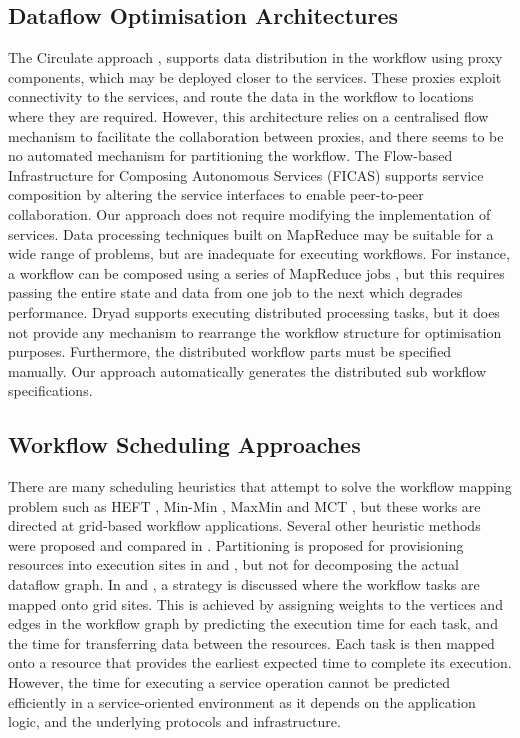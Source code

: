 \documentclass[10pt, conference, compsocconf]{IEEEtran}
\begin{document}
\subsection{Dataflow Optimisation Architectures}
The Circulate approach \cite{Circulate}, \cite{Circulate2} supports data distribution in the workflow using proxy components, which may be deployed closer to the services.
These proxies exploit connectivity to the services, and route the data in the workflow to locations where they are required.
However, this architecture relies on a centralised flow mechanism to facilitate the collaboration between proxies, and there seems to be no automated mechanism for partitioning the workflow.
The Flow-based Infrastructure for Composing Autonomous Services (FICAS) \cite{Ficas} supports service composition by altering the service interfaces to enable peer-to-peer collaboration.
Our approach does not require modifying the implementation of services.
Data processing techniques built on MapReduce \cite{MapReduce} may be suitable for a wide range of problems, but are inadequate for executing workflows.
For instance, a workflow can be composed using a series of MapReduce jobs \cite{MapReduce2}, but this requires passing the entire state and data from one job to the next which degrades performance.
Dryad \cite{Dryad} supports executing distributed processing tasks, but it does not provide any mechanism to rearrange the workflow structure for optimisation purposes.
Furthermore, the distributed workflow parts must be specified manually.
Our approach automatically generates the distributed sub workflow specifications.

\subsection{Workflow Scheduling Approaches}
There are many scheduling heuristics that attempt to solve the workflow mapping problem such as HEFT \cite{HEFT}, Min-Min \cite{MinMin}, MaxMin and MCT \cite{MaxMinMCT}, but these works are directed at grid-based workflow applications.
Several other heuristic methods were proposed and compared in \cite{DAGSchedulingHeuristics}.
Partitioning is proposed for provisioning resources into execution sites in \cite{NonDAG} and \cite{NonDAG2}, but not for decomposing the actual dataflow graph.
In \cite{RunTimeOptimisation} and \cite{Askalon}, a strategy is discussed where the workflow tasks are mapped onto grid sites.
This is achieved by assigning weights to the vertices and edges in the workflow graph by predicting the execution time for each task, and the time for transferring data between the resources.
Each task is then mapped onto a resource that provides the earliest expected time to complete its execution.
However, the time for executing a service operation cannot be predicted efficiently in a service-oriented environment as it depends on the application logic, and the underlying protocols and infrastructure.
\end{document}
